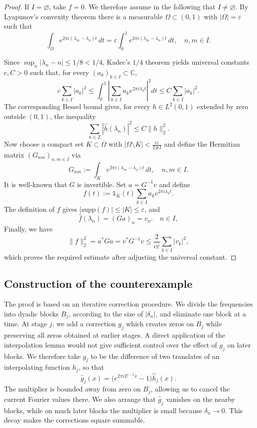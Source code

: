 \documentclass[reqno,a4paper,12pt]{amsart}
\numberwithin{equation}{section}
\def\Z{{\mathbb Z}}
\def\C{{\mathbb C}}
\newcommand{\supp}{{\mathrm{supp}}}
\newcommand\1{\mathds{1}}
\begin{document}
\begin{proof}
If $I=\varnothing$, take $f=0$. We therefore assume in the following that $I\neq\varnothing$.
By Lyapunov's convexity theorem \cite{Liapounoff1940,Barvinok2002} there is a measurable $\Omega\subset(0,1)$ with
$|\Omega|=\varepsilon$ such that
\begin{equation}\label{eq:782tg8uhwboi}
    \int_\Omega e^{2\pi i(\lambda_m-\lambda_n)t}\,dt
    =\varepsilon\int_0^1
    e^{2\pi i(\lambda_m-\lambda_n)t}\,dt,
    \quad n,m\in I.
\end{equation}

Since $\sup_n|\lambda_n-n|\leq1/8<1/4$, Kadec's $1/4$ theorem \cite{Kadets1964,Young2001} yields universal
constants $c,C>0$ such that, for every $(a_k)_{k\in I}\subset\C$,
\begin{equation}\label{eq:asymp-kadec}
    c\sum_{k\in I}|a_k|^2
    \leq
    \int_0^1\left|\sum_{k\in I}a_ke^{2\pi i\lambda_k t}\right|^2dt
    \leq C\sum_{k\in I}|a_k|^2.
\end{equation}
The corresponding Bessel bound gives, for every $h\in L^2(0,1)$
extended by zero outside $(0,1)$, the inequality
\begin{equation}\label{eq:asymp-bessel}
    \sum_{n\in\Z}|\widehat h(\lambda_n)|^2
    \leq C\|h\|_2^2.
\end{equation}
Now choose a compact set $K\subset\Omega$ with
$
    |\Omega\setminus K|<\frac{c\varepsilon}{2\# I}
$
and define the Hermitian matrix $(G_{nm})_{n,m \in I}$ via
\[
    G_{nm}:=\int_K e^{2\pi i(\lambda_m-\lambda_n)t}\,dt,
    \quad n,m\in I.
\]
It is well-known that $G$ is invertible.
Set $a=G^{-1}v$ and define
\[
    f(t):=\1_K(t)\sum_{k\in I}a_ke^{2\pi i\lambda_k t}.
\]
The definition of $f$ gives $|\supp(f)|\leq|K|\leq\varepsilon$, and
\[
    \widehat f(\lambda_n)=(Ga)_n=v_n.
    \quad n\in I,
\]
Finally, we have
\[
    \|f\|_2^2=a^*Ga=v^*G^{-1}v
    \leq\frac{2}{c\varepsilon}\sum_{k\in I}|v_k|^2,
\]
which proves the required estimate after adjusting the universal constant.
\end{proof}


\subsection{Construction of the counterexample}

The proof is based on an iterative correction procedure. We divide the frequencies into dyadic blocks \(B_j\), according to the size of \(|\delta_n|\), and eliminate one block at a time. At stage \(j\), we add a correction \(g_j\) which creates zeros on \(B_j\) while preserving all zeros obtained at earlier stages. A direct application of the interpolation lemma would not give sufficient control over the effect of \(g_j\) on later blocks. We therefore take \(g_j\) to be the difference of two translates of an interpolating function \(h_j\), so that
\[
    \widehat g_j(x)
    =\bigl(e^{2\pi i2^{j-1}x}-1\bigr)\widehat h_j(x).
\]
The multiplier is bounded away from zero on \(B_j\), allowing us to cancel the current Fourier values there. We also arrange that \(\widehat g_j\) vanishes on the nearby blocks, while on much later blocks the multiplier is small because \(\delta_n\to0\). This decay
makes the corrections square summable.
\end{document}

